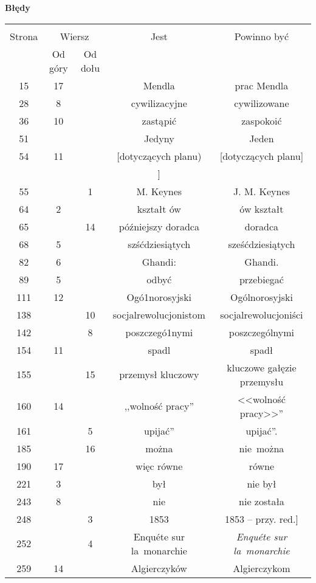 \documentclass[a4paper,11pt]{article}
\newcommand{\tb}{\textbf}
\newcommand{\Center}[1]{\begin{center} #1 \end{center}}
\newcommand{\CenterTB}[1]{\Center{\tb{#1}}}
\begin{document}
\newpage
\CenterTB{Błędy}
\begin{center}
  \begin{tabular}{|c|c|c|c|c|}
    \hline
    & \multicolumn{2}{c|}{} & & \\
    Strona & \multicolumn{2}{c|}{Wiersz}& Jest & Powinno być \\ \cline{2-3}
    & Od góry & Od dołu & & \\ \hline
    15 & 17 & & Mendla & prac Mendla \\
    28 & 8 & & cywilizacyjne & cywilizowane \\
    36 & 10 & & zastąpić & zaspokoić \\
    51 & & & Jedyny & Jeden \\
    54 & 11 & & [dotyczących planu) & [dotyczących planu] \\
    & & & ] & \\
    55 & & 1 & M. Keynes & J. M. Keynes \\
    64 & 2 & & kształt ów & ów kształt \\
    65 & & 14 & późniejszy doradca & doradca \\
    68 & 5 & & szśćdziesiątych & sześćdziesiątych \\
    82 & 6 & & Ghandi: & Ghandi. \\
    89 & 5 & & odbyć & przebiegać \\
    111 & 12 & & Ogó1norosyjski & Ogólnorosyjski \\
    138 & & 10 & socjalrewolucjonistom & socjalrewolucjoniści \\
    142 & & 8 & poszczegó1nymi & poszczególnymi \\
    154 & 11 & & spadl & spadł \\
    155 & & 15 & przemysł kluczowy & kluczowe gałęzie przemysłu \\
    160 & 14 & & ,,wolność pracy'' & <<wolność pracy>>'' \\
    161 & & 5 & upijać'' & upijać''. \\
    185 & & 16 & można & nie~można \\
    190 & 17 & & więc równe & równe \\
    221 & 3 & & był & nie był \\
    243 & 8 & & nie & nie została \\
    248 & & 3 & 1853 & 1853 -- przy. red.] \\
    252 & & 4 & Enqu\'{e}te sur la~monarchie
           & \emph{Enqu\'{e}te sur la~monarchie} \\
    259 & 14 & & Algierczyków & Algierczykom \\

\end{tabular}
\end{center}
\end{document}
